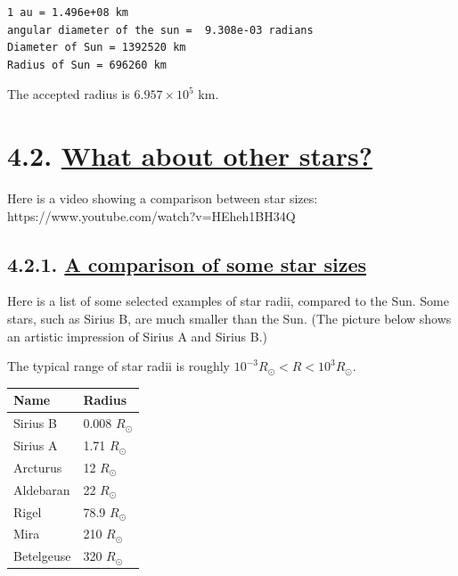 \documentclass[
  letterpaper,
  DIV=11,
  numbers=noendperiod]{scrreprt}
\begin{document}
\begin{verbatim}
1 au = 1.496e+08 km
angular diameter of the sun =  9.308e-03 radians
Diameter of Sun = 1392520 km
Radius of Sun = 696260 km
\end{verbatim}

The accepted radius is \(6.957\times 10^5\) km.

\hypertarget{what-about-other-stars}{%
\section{\texorpdfstring{4.2. \protect\hyperlink{toc0_}{What about other
stars?}}{4.2. What about other stars?}}\label{what-about-other-stars}}

Here is a video showing a comparison between star sizes:
https://www.youtube.com/watch?v=HEheh1BH34Q

\hypertarget{a-comparison-of-some-star-sizes}{%
\subsection{\texorpdfstring{4.2.1. \protect\hyperlink{toc0_}{A
comparison of some star
sizes}}{4.2.1. A comparison of some star sizes}}\label{a-comparison-of-some-star-sizes}}

Here is a list of some selected examples of star radii, compared to the
Sun. Some stars, such as Sirius B, are much smaller than the Sun. (The
picture below shows an artistic impression of Sirius A and Sirius B.)

The typical range of star radii is roughly
\(10^{-3}R_\odot < R < 10^3 R_\odot\).

\begin{longtable}[]{@{}ll@{}}
\toprule\noalign{}
Name & Radius \\
\midrule\noalign{}
\endhead
\bottomrule\noalign{}
\endlastfoot
Sirius B & 0.008 \(R_\odot\) \\
Sirius A & 1.71 \(R_\odot\) \\
Arcturus & 12 \(R_\odot\) \\
Aldebaran & 22 \(R_\odot\) \\
Rigel & 78.9 \(R_\odot\) \\
Mira & 210 \(R_\odot\) \\
Betelgeuse & 320 \(R_\odot\) \\
\end{longtable}
\end{document}
